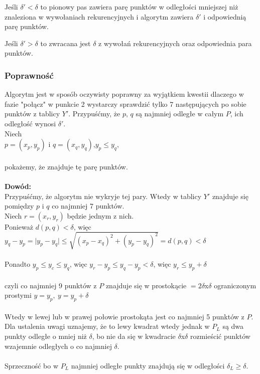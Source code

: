 \begin{itemize}
		Jeśli $\delta'<\delta$ to pionowy pas zawiera parę punktów w odległości mniejszej niż znaleziona w  wywołaniach rekurencyjnych i algorytm zawiera $\delta'$ i odpowiednią parę punktów.
		
		Jeśli $\delta'>\delta$ to zwracana jest $\delta$ z wywołań rekurencyjnych oraz odpowiednia para punktów.
\end{itemize}

\subsubsection{Poprawność}
Algorytm jest w sposób oczywisty poprawny za wyjątkiem kwestii dlaczego w fazie "połącz" w punkcie 2 wystarczy sprawdzić tylko 7 następujących po sobie punktów z tablicy $Y'$. Przypuśćmy, że $p$, $q$ są najmniej odległe w całym $P$, ich odległość wynosi $\delta'$.\\
Niech \\
\tab $p=(x_p,y_p)$ i $q=(x_q,y_q)$,\tab \tab $y_p\leq y_q$,\\
\\
pokażemy, że znajduje tę parę punktów.\\
\\
\textbf{Dowód: }\\
Przypuśćmy, że algorytm nie wykryje tej pary. Wtedy w tablicy $Y'$ znajduje się pomiędzy $p$ i $q$ co najmniej 7 punktów.\\
Niech $r=(x_r,y_r)$ będzie jednym z nich.\\
Ponieważ $d(p,q)<\delta$, więc $y_q-y_p = \vert y_p - y_q \vert \leq \sqrt{(x_p-x_q)^2+(y_p-y_q)^2}=d(p,q)<\delta$\\
\\
Ponadto $y_p\leq y_c\leq y_q$, więc $y_r-y_p \leq y_q-y_p<\delta$, więc $y_r\leq y_p + \delta$\\
\\
czyli co najmniej 9 punktów z $P$ znajduje się w prostokącie $=2\delta$x$\delta$ ograniczonym prostymi $y=y_p,\ y=y_p+\delta$\\
\\
Wtedy w lewej lub w prawej połowie prostokąta jest co najmniej 5 punktów z $P$. Dla ustalenia uwagi uznajemy, że to lewy kwadrat wtedy jednak w $P_L$ są dwa punkty odległe o mniej niż $\delta$, bo nie da się w kwadracie $\delta$x$\delta$ rozmieścić punktów wzajemnie odległych o co najmniej $\delta$.\\
\\
Sprzeczność bo w $P_L$ najmniej odległe punkty znajdują się w odległości $\delta_L \geq \delta$.

